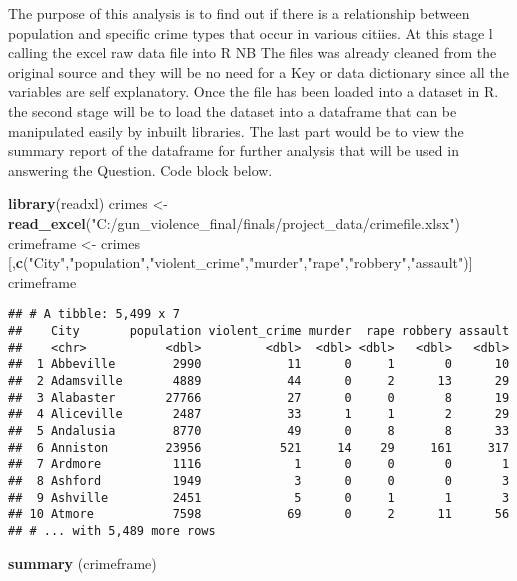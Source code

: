 \documentclass[]{article}
\newenvironment{Shaded}{\begin{snugshade}}{\end{snugshade}}
\newcommand{\KeywordTok}[1]{\textcolor[rgb]{0.13,0.29,0.53}{\textbf{#1}}}
\newcommand{\StringTok}[1]{\textcolor[rgb]{0.31,0.60,0.02}{#1}}
\newcommand{\NormalTok}[1]{#1}
\begin{document}
The purpose of this analysis is to find out if there is a relationship
between population and specific crime types that occur in various
citiies. At this stage l calling the excel raw data file into R NB The
files was already cleaned from the original source and they will be no
need for a Key or data dictionary since all the variables are self
explanatory. Once the file has been loaded into a dataset in R. the
second stage will be to load the dataset into a dataframe that can be
manipulated easily by inbuilt libraries. The last part would be to view
the summary report of the dataframe for further analysis that will be
used in answering the Question. Code block below.

\begin{Shaded}
\begin{Highlighting}[]
\KeywordTok{library}\NormalTok{(readxl)}
\NormalTok{crimes <-}\StringTok{ }\KeywordTok{read_excel}\NormalTok{(}\StringTok{"C:/gun_violence_final/finals/project_data/crimefile.xlsx"}\NormalTok{)}
\NormalTok{crimeframe <-}\StringTok{ }\NormalTok{crimes [,}\KeywordTok{c}\NormalTok{(}\StringTok{"City"}\NormalTok{,}\StringTok{"population"}\NormalTok{,}\StringTok{"violent_crime"}\NormalTok{,}\StringTok{"murder"}\NormalTok{,}\StringTok{"rape"}\NormalTok{,}\StringTok{"robbery"}\NormalTok{,}\StringTok{"assault"}\NormalTok{)]}
\NormalTok{crimeframe}
\end{Highlighting}
\end{Shaded}

\begin{verbatim}
## # A tibble: 5,499 x 7
##    City       population violent_crime murder  rape robbery assault
##    <chr>           <dbl>         <dbl>  <dbl> <dbl>   <dbl>   <dbl>
##  1 Abbeville        2990            11      0     1       0      10
##  2 Adamsville       4889            44      0     2      13      29
##  3 Alabaster       27766            27      0     0       8      19
##  4 Aliceville       2487            33      1     1       2      29
##  5 Andalusia        8770            49      0     8       8      33
##  6 Anniston        23956           521     14    29     161     317
##  7 Ardmore          1116             1      0     0       0       1
##  8 Ashford          1949             3      0     0       0       3
##  9 Ashville         2451             5      0     1       1       3
## 10 Atmore           7598            69      0     2      11      56
## # ... with 5,489 more rows
\end{verbatim}

\begin{Shaded}
\begin{Highlighting}[]
\KeywordTok{summary}\NormalTok{ (crimeframe)}
\end{Highlighting}
\end{Shaded}
\end{document}
